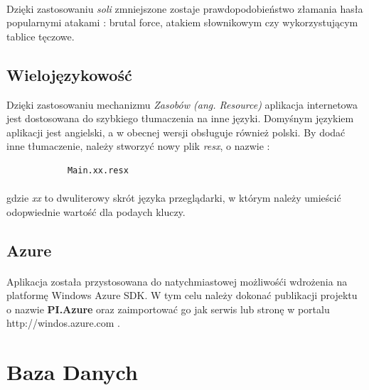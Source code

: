 \paragraph{} %
\label{par:}
Dzięki zastosowaniu \textit{soli} zmniejszone zostaje prawdopodobieństwo złamania hasła popularnymi atakami : brutal force, atakiem słownikowym czy wykorzystującym tablice tęczowe.


\subsection{Wielojęzykowość} %
\label{sub:wieloj_zykowo_}
Dzięki zastosowaniu mechanizmu \textit{Zasobów (ang. Resource)} aplikacja internetowa jest dostosowana do szybkiego tłumaczenia na inne języki. Domyśnym językiem aplikacji jest angielski, a w obecnej wersji obsługuje również polski. By dodać inne tłumaczenie, należy stworzyć nowy plik \textit{resx}, o nazwie :

\begin{lstlisting}
			Main.xx.resx
\end{lstlisting}

\paragraph{} %
\label{par:}
gdzie \textit{xx} to dwuliterowy skrót języka przeglądarki, w którym należy umieścić odopwiednie wartość dla podaych kluczy.

\subsection{Azure} %
\label{sub:azure}
\paragraph{} %
\label{par:}
Aplikacja została przystosowana do natychmiastowej możliwośći wdrożenia na platformę Windows Azure SDK. W tym celu należy dokonać publikacji projektu o nazwie \textbf{PI.Azure} oraz zaimportować go jak serwis lub stronę w portalu http://windos.azure.com .

\section{Baza Danych} %
\label{sec:baza_danych}
